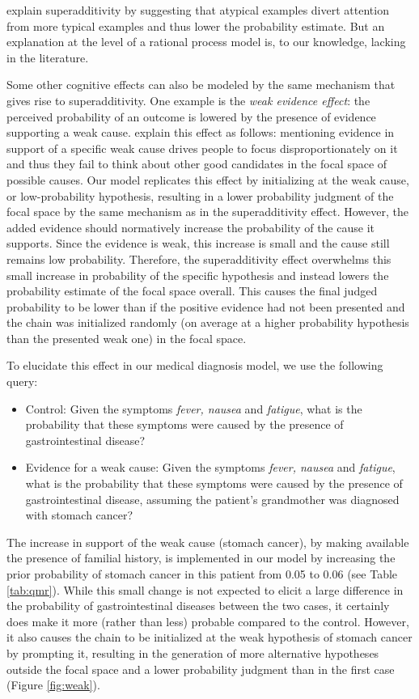 \cite{super} explain superadditivity by suggesting that atypical examples divert attention from more typical examples and thus lower the probability estimate. But an explanation at the level of a rational process model is, to our knowledge, lacking in the literature. 


Some other cognitive effects can also be modeled by the same mechanism that gives rise to superadditivity. One example is the \emph{weak evidence effect}: the perceived probability of an outcome is lowered by the presence of evidence supporting a weak cause. %
 \cite{weak} explain this effect as follows: mentioning evidence in support of a specific weak cause drives people to focus disproportionately on it and thus they fail to think about other good candidates in the focal space of possible causes. Our model replicates this effect by initializing at the weak cause, or low-probability hypothesis, resulting in a lower probability judgment of the focal space by the same mechanism as in the superadditivity effect. However, the added evidence should normatively increase the probability of the cause it supports. Since the evidence is weak, this increase is small and the cause still remains low probability. Therefore, the superadditivity effect overwhelms this small increase in probability of the specific hypothesis and instead lowers the probability estimate of the focal space overall. This causes the final judged probability to be lower than if the positive evidence had not been presented and the chain was initialized randomly (on average at a higher probability hypothesis than the presented weak one) in the focal space.

To elucidate this effect in our medical diagnosis model, we use the following query:
\begin{itemize}
\item Control: Given the symptoms \emph{fever, nausea}  and \emph{fatigue}, what is the probability that these symptoms were caused by the presence of gastrointestinal disease?
\item Evidence for a weak cause: Given the symptoms \emph{fever, nausea}  and \emph{fatigue}, what is the probability that these symptoms were caused by the presence of gastrointestinal disease, assuming the patient's grandmother was diagnosed with stomach cancer?
\end{itemize}
The increase in support of the weak cause (stomach cancer), by making available the presence of familial history, is implemented in our model by increasing the prior probability of stomach cancer in this patient from 0.05 to 0.06 (see Table \ref{tab:qmr}). While this small change is not expected to elicit a large difference in the probability of gastrointestinal diseases between the two cases, it certainly does make it more (rather than less) probable compared to the control. However, it also causes the chain to be initialized at the weak hypothesis of stomach cancer by prompting it, resulting in the generation of more alternative hypotheses outside the focal space and a lower probability judgment than in the first case (Figure \ref{fig:weak}).

